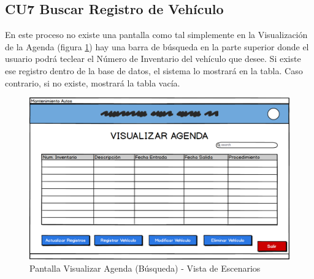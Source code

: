 \subsection{CU7 Buscar Registro de Vehículo \label{sub:buscar registro}}
En este proceso no existe una pantalla como tal simplemente en la Visualización de la Agenda (figura \ref{fig:Pantalla Visualizar Agenda (busqueda)- Vista de Escenarios}) hay una barra de búsqueda en la parte superior donde el usuario podrá teclear el Número de Inventario del vehículo que desee. Si existe ese registro dentro de la base de datos, el sistema lo mostrará en la tabla. Caso contrario, si no existe, mostrará la tabla vacía. 
\begin{figure}[!h]
	\centering
	\includegraphics[width=1\textwidth]{./diseno/vescenarios/imagenes/VisualizarAgenda}
	\caption{Pantalla Visualizar Agenda (Búsqueda) - Vista de Escenarios}
	\label{fig:Pantalla Visualizar Agenda (busqueda)- Vista de Escenarios}
\end{figure}
\clearpage